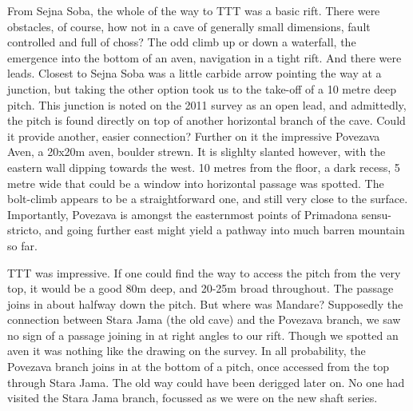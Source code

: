 From Sejna Soba, the whole of the way to TTT was a basic rift. There were obstacles, of course, how not in a cave of generally small dimensions, fault controlled and full of choss? The odd climb up or down a waterfall, the emergence into the bottom of an aven, navigation in a tight rift. And there were leads. Closest to Sejna Soba was a little carbide arrow pointing the way at a junction, but taking the other option took us to the take-off of a 10 metre deep pitch. This junction is noted on the 2011 survey as an open lead, and admittedly, the pitch is found directly on top of another horizontal branch of the cave. Could it provide another, easier connection? Further on it the impressive Povezava Aven, a 20x20m aven, boulder strewn. It is slighlty slanted however, with the eastern wall dipping towards the west. 10 metres from the floor, a dark recess, 5 metre wide  that could be a window into horizontal passage was spotted. The bolt-climb appears to be a straightforward one, and still very close to the surface. Importantly, Povezava is amongst the easternmost points of Primadona sensu-stricto, and going further east might yield a pathway into much barren mountain so far.



TTT was impressive. If one could find the way to access the pitch from the very top, it would be a good 80m deep, and 20-25m broad throughout. The passage joins in about halfway down the pitch. But where was Mandare? Supposedly the connection between Stara Jama (the old cave) and the Povezava branch, we saw no sign of a passage joining in at right angles to our rift. Though we spotted an aven it was nothing like the drawing on the survey. In all probability, the Povezava branch joins in at the bottom of a pitch, once accessed from the top through Stara Jama. The old way could have been derigged later on. No one had visited the Stara Jama branch, focussed as we were on the new shaft series. 

